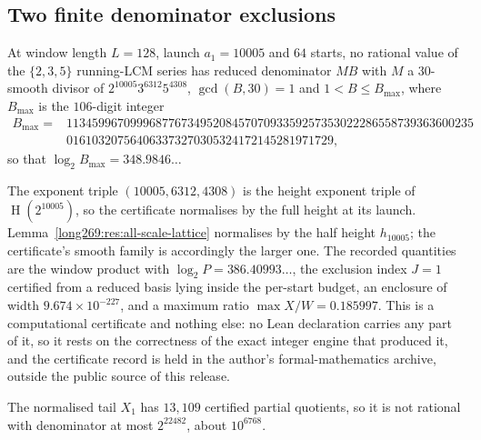\documentclass[11pt]{article}
\newcommand{\hgt}{\operatorname{H}}
\begin{document}
\subsection{Two finite denominator exclusions}

\begin{theorem}
\label{long269:res:lead-block-exclusion}
At window length $L=128$, launch $a_1=10005$ and $64$ starts, no rational value
of the $\{2,3,5\}$ running-LCM series has reduced denominator $MB$ with $M$ a
$30$-smooth divisor of $2^{10005}3^{6312}5^{4308}$, $\gcd(B,30)=1$ and
$1<B\le B_{\max}$, where $B_{\max}$ is the $106$-digit integer
\[
\begin{aligned}
 B_{\max}={}&1134599670999687767349520845707093359257353022286558739363600235\\
 &016103207564063373270305324172145281971729 ,
\end{aligned}
\]
so that $\log_2B_{\max}=348.9846\ldots$
\end{theorem}

The exponent triple $(10005,6312,4308)$ is the height exponent triple of
$\hgt(2^{10005})$, so the certificate normalises by the full height at its
launch.  Lemma~\ref{long269:res:all-scale-lattice} normalises by the half height
$h_{10005}$; the certificate's smooth family is accordingly the larger one.  The recorded quantities are the window product with
$\log_2P=386.40993\ldots$, the exclusion index $J=1$ certified from a reduced
basis lying inside the per-start budget, an enclosure of width
$9.674\times10^{-227}$, and a maximum ratio $\max X/W=0.185997$.  This is a
computational certificate and nothing else: no Lean declaration carries any
part of it, so it rests on the correctness of the exact integer engine that
produced it, and the certificate record is held in the author's
formal-mathematics archive, outside the public source of this release.

\begin{theorem}
\label{long269:res:cf-exclusion}
The normalised tail $X_1$ has $13{,}109$ certified partial quotients, so it is
not rational with denominator at most $2^{22482}$, about $10^{6768}$.
\end{theorem}
\end{document}
